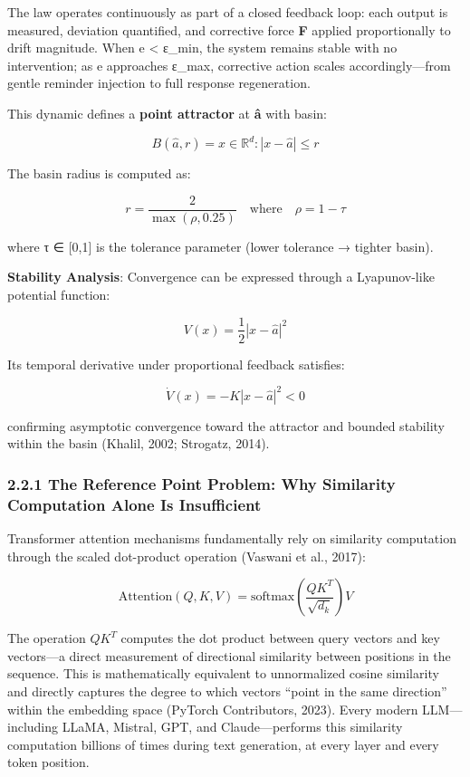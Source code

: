 The law operates continuously as part of a closed feedback loop: each
output is measured, deviation quantified, and corrective force
\textbf{F} applied proportionally to drift magnitude. When e \textless{}
ε\_min, the system remains stable with no intervention; as e approaches
ε\_max, corrective action scales accordingly---from gentle reminder
injection to full response regeneration.

This dynamic defines a \textbf{point attractor} at \textbf{â} with
basin:

\[B(\hat{a}, r) = {x \in \mathbb{R}^d : |x - \hat{a}| \leq r}\]

The basin radius is computed as:

\[r = \frac{2}{\max(\rho, 0.25)} \quad \text{where} \quad \rho = 1 - \tau\]

where τ ∈ {[}0,1{]} is the tolerance parameter (lower tolerance →
tighter basin).

\textbf{Stability Analysis}: Convergence can be expressed through a
Lyapunov-like potential function:

\[V(x) = \frac{1}{2}|x - \hat{a}|^2\]

Its temporal derivative under proportional feedback satisfies:

\[\dot{V}(x) = -K|x - \hat{a}|^2 < 0\]

confirming asymptotic convergence toward the attractor and bounded
stability within the basin (Khalil, 2002; Strogatz, 2014).

\subsubsection{2.2.1 The Reference Point Problem: Why Similarity
Computation Alone Is
Insufficient}\label{the-reference-point-problem-why-similarity-computation-alone-is-insufficient}

Transformer attention mechanisms fundamentally rely on similarity
computation through the scaled dot-product operation (Vaswani et al.,
2017):

\[\text{Attention}(Q, K, V) = \text{softmax}\left(\frac{QK^T}{\sqrt{d_k}}\right) V\]

The operation \(QK^T\) computes the dot product between query vectors
and key vectors---a direct measurement of directional similarity between
positions in the sequence. This is mathematically equivalent to
unnormalized cosine similarity and directly captures the degree to which
vectors ``point in the same direction'' within the embedding space
(PyTorch Contributors, 2023). Every modern LLM---including LLaMA,
Mistral, GPT, and Claude---performs this similarity computation billions
of times during text generation, at every layer and every token
position.

